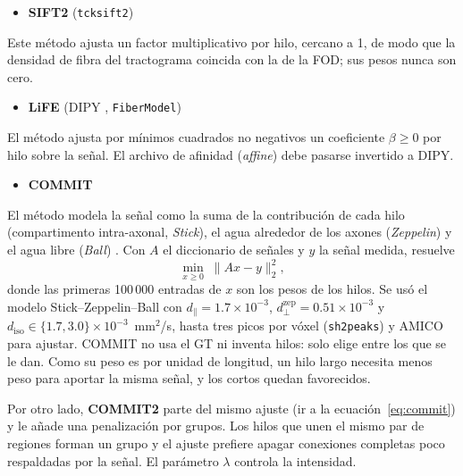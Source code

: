 \documentclass[11pt,a4paper]{article}
\newcommand{\code}[1]{\texttt{\small #1}}
\begin{document}
\begin{itemize}
    \item \textbf{SIFT2} \cite{smith2015} (\code{tcksift2}) 
\end{itemize}

Este método ajusta un factor multiplicativo por hilo, cercano a 1, de modo que la densidad de fibra del tractograma coincida con la de la FOD;
sus pesos nunca son cero.

\begin{itemize}
    \item \textbf{LiFE} \cite{pestilli2014} (DIPY \cite{garyfallidis2014}, \code{FiberModel}) 
\end{itemize}

El método ajusta por m\'inimos cuadrados no negativos un coeficiente $\beta\ge 0$ por hilo sobre la se\~nal. El archivo de afinidad (\textit{affine}) debe pasarse invertido a DIPY.

\begin{itemize}
    \item \textbf{COMMIT} \cite{daducci2015} 
\end{itemize}

El método modela la se\~nal como la suma de la contribuci\'on de cada hilo (compartimento intra-axonal, \textit{Stick}), el agua alrededor de los axones (\textit{Zeppelin}) y el agua libre (\textit{Ball}) \cite{panagiotaki2012}. Con $A$ el
diccionario de se\~nales y $y$ la se\~nal medida, resuelve
\begin{equation}\label{eq:commit}
  \min_{x\ge 0}\; \lVert A x - y\rVert_2^2 ,
\end{equation}
donde las primeras 100\,000 entradas de $x$ son los pesos de los hilos. Se us\'o el modelo
Stick--Zeppelin--Ball con $d_\parallel=1.7\times10^{-3}$, $d_{\perp}^{\mathrm{zep}}=0.51\times10^{-3}$
y $d_{\mathrm{iso}}\in\{1.7,3.0\}\times10^{-3}$~mm$^2$/s, hasta tres picos por v\'oxel
(\code{sh2peaks}) y AMICO \cite{daducci2015amico} para ajustar. COMMIT no usa el GT ni
inventa hilos: solo elige entre los que se le dan. Como su peso es por unidad de longitud,
un hilo largo necesita menos peso para aportar la misma se\~nal, y los cortos quedan
favorecidos.

Por otro lado, \textbf{COMMIT2} \cite{schiavi2020} parte del mismo ajuste (ir a la ecuación~\eqref{eq:commit}) y le añade una penalizaci\'on por grupos. Los hilos que
unen el mismo par de regiones forman un grupo y el ajuste prefiere apagar conexiones
completas poco respaldadas por la se\~nal. El par\'ametro $\lambda$ controla la intensidad.
\end{document}
